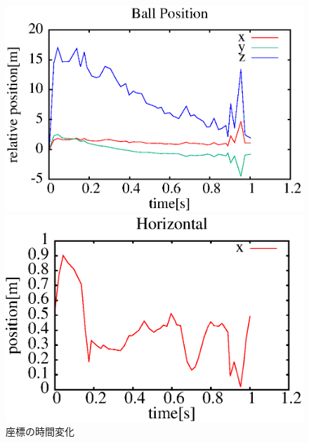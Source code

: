 \documentclass[twocolumn]{preport}
\begin{document}
\begin{figure}[tbh]
 \begin{center}
  \begin{minipage}{0.6\columnwidth}
   \includegraphics[width=\columnwidth]{ball_coords_316.eps}
   \caption{座標の時間変化}
   \label{figure:coords_graph}
  \end{minipage}
  \begin{minipage}{0.35\columnwidth}
   \includegraphics[width=\columnwidth]{est_x_316.eps}

\end{minipage}
\end{center}
\end{figure}
\end{document}
